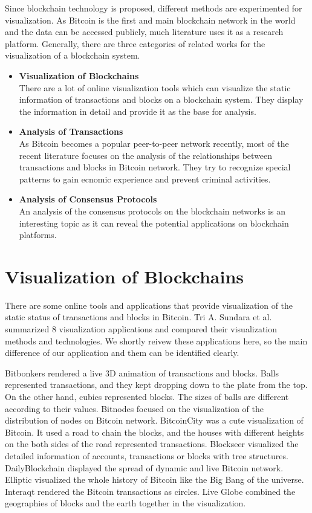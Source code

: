 Since blockchain technology is proposed, different methods are experimented for visualization. As Bitcoin is the first and main blockchain network in the world and the data can be accessed publicly, much literature uses it as a research platform. Generally, there are three categories of related works for the visualization of a blockchain system.
\begin{itemize}
    \item \textbf{Visualization of Blockchains} \\
        There are a lot of online visualization tools which can visualize the static information of transactions and blocks on a blockchain system. They display the information in detail and provide it as the base for analysis.
    \item \textbf{Analysis of Transactions} \\
        As Bitcoin becomes a popular peer-to-peer network recently, most of the recent literature focuses on the analysis of the relationships between transactions and blocks in Bitcoin network. They try to recognize special patterns to gain ecnomic experience and prevent criminal activities.
    \item \textbf{Analysis of Consensus Protocols} \\
        An analysis of the consensus protocols on the blockchain networks is an interesting topic as it can reveal the potential applications on blockchain platforms.
\end{itemize}

\section{Visualization of Blockchains}

There are some online tools and applications that provide visualization of the static status of transactions and blocks in Bitcoin. Tri A. Sundara et al. \cite{Sundara2017} summarized 8 visualization applications and compared their visualization methods and technologies. We shortly reivew these applications here, so the main difference of our application and them can be identified clearly.

Bitbonkers \cite{bitbonkers} rendered a live 3D animation of transactions and blocks. Balls represented transactions, and they kept dropping down to the plate from the top. On the other hand, cubics represented blocks. The sizes of balls are different according to their values. Bitnodes \cite{bitnodes} focused on the visualization of the distribution of nodes on Bitcoin network. BitcoinCity \cite{bitcoincity} was a cute visualization of Bitcoin. It used a road to chain the blocks, and the houses with different heights on the both sides of the road represented transactions. Blockseer \cite{blockseer} visualized the detailed information of accounts, transactions or blocks with tree structures. DailyBlockchain \cite{dailyblockchain} displayed the spread of dynamic and live Bitcoin network. Elliptic \cite{elliptic} visualized the whole history of Bitcoin like the Big Bang of the universe. Interaqt \cite{interaqt} rendered the Bitcoin transactions as circles. Live Globe \cite{liveglobe} combined the geographies of blocks and the earth together in the visualization.

